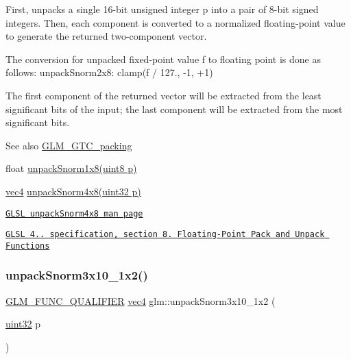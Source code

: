 First, unpacks a single 16-\/bit unsigned integer p into a pair of 8-\/bit signed integers. Then, each component is converted to a normalized floating-\/point value to generate the returned two-\/component vector.

The conversion for unpacked fixed-\/point value f to floating point is done as follows\+: unpack\+Snorm2x8\+: clamp(f / 127., -\/1, +1)

The first component of the returned vector will be extracted from the least significant bits of the input; the last component will be extracted from the most significant bits.

\begin{DoxySeeAlso}{See also}
\hyperlink{group__gtc__packing}{G\+L\+M\+\_\+\+G\+T\+C\+\_\+packing} 

float \hyperlink{group__gtc__packing_ga6f2bebf536fbf7c8b97d4b306bb3354e}{unpack\+Snorm1x8(uint8 p)} 

\hyperlink{group__core__types_ga5881b1b022d7fd1b7218f5916532dd02}{vec4} \hyperlink{group__core__func__packing_ga2db488646d48b7c43d3218954523fe82}{unpack\+Snorm4x8(uint32 p)} 

\href{http://www.opengl.org/sdk/docs/manglsl/xhtml/unpackSnorm4x8.xml}{\tt G\+L\+SL unpack\+Snorm4x8 man page} 

\href{http://www.opengl.org/registry/doc/GLSLangSpec.4.20.8.pdf}{\tt G\+L\+SL 4.. specification, section 8. Floating-\/\+Point Pack and Unpack Functions} 
\end{DoxySeeAlso}
\mbox{\label{group__gtc__packing_ga8b8bb827a3743ca553d8702d3e337101}} 
\subsubsection{\texorpdfstring{unpack\+Snorm3x10\+\_\+1x2()}{unpackSnorm3x10\_1x2()}}
{\footnotesize\ttfamily \hyperlink{setup_8hpp_a33fdea6f91c5f834105f7415e2a64407}{G\+L\+M\+\_\+\+F\+U\+N\+C\+\_\+\+Q\+U\+A\+L\+I\+F\+I\+ER} \hyperlink{group__core__types_ga5881b1b022d7fd1b7218f5916532dd02}{vec4} glm\+::unpack\+Snorm3x10\+\_\+1x2 (\begin{DoxyParamCaption}\item[{\hyperlink{group__gtc__type__precision_ga202b6a53c105fcb7e531f9b443518451}{uint32}}]{p }\end{DoxyParamCaption})}

